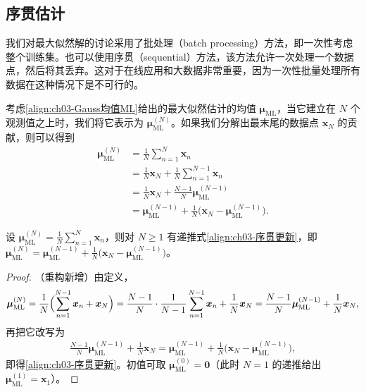 \documentclass[../../main.tex]{subfiles}
\begin{document}
\subsection{序贯估计}\label{subsection:ch03-序贯估计}

我们对最大似然解的讨论采用了批处理（batch processing）方法，即一次性考虑整个训练集。也可以使用序贯（sequential）方法，该方法允许一次处理一个数据点，然后将其丢弃。这对于在线应用和大数据非常重要，因为一次性批量处理所有数据在这种情况下是不可行的。

考虑\eqref{align:ch03-Gauss均值ML}给出的最大似然估计的均值 $\boldsymbol{\mu}_{\mathrm{ML}}$，当它建立在 $N$ 个观测值之上时，我们将它表示为 $\boldsymbol{\mu}_{\mathrm{ML}}^{(N)}$。如果我们分解出最末尾的数据点 $\boldsymbol{x}_N$ 的贡献，则可以得到
\begin{align}
\boldsymbol{\mu}_{\mathrm{ML}}^{(N)}&=\frac{1}{N}\sum_{n=1}^{N}\boldsymbol{x}_n\nonumber\\
&=\frac{1}{N}\boldsymbol{x}_N+\frac{1}{N}\sum_{n=1}^{N-1}\boldsymbol{x}_n\nonumber\\
&=\frac{1}{N}\boldsymbol{x}_N+\frac{N-1}{N}\boldsymbol{\mu}_{\mathrm{ML}}^{(N-1)}\nonumber\\
&=\boldsymbol{\mu}_{\mathrm{ML}}^{(N-1)}+\frac{1}{N}\bigl(\boldsymbol{x}_N-\boldsymbol{\mu}_{\mathrm{ML}}^{(N-1)}\bigr).
\label{align:ch03-序贯更新}
\end{align}

\begin{proposition}[样本均值的序贯更新]\label{proposition:ch03-序贯更新}
设 $\boldsymbol{\mu}_{\mathrm{ML}}^{(N)}=\frac{1}{N}\sum_{n=1}^{N}\boldsymbol{x}_n$，则对 $N\geqslant1$ 有递推式\eqref{align:ch03-序贯更新}，即 $\boldsymbol{\mu}_{\mathrm{ML}}^{(N)}=\boldsymbol{\mu}_{\mathrm{ML}}^{(N-1)}+\frac{1}{N}\bigl(\boldsymbol{x}_N-\boldsymbol{\mu}_{\mathrm{ML}}^{(N-1)}\bigr)$。
\end{proposition}
\begin{proof}
（重构新增）由定义，
\begin{align*}
\boldsymbol{\mu}_{\mathrm{ML}}^{(N)}=\frac{1}{N}\Bigl(\sum_{n=1}^{N-1}\boldsymbol{x}_n+\boldsymbol{x}_N\Bigr)=\frac{N-1}{N}\cdot\frac{1}{N-1}\sum_{n=1}^{N-1}\boldsymbol{x}_n+\frac{1}{N}\boldsymbol{x}_N=\frac{N-1}{N}\boldsymbol{\mu}_{\mathrm{ML}}^{(N-1)}+\frac{1}{N}\boldsymbol{x}_N,
\end{align*}
再把它改写为
\begin{align*}
\frac{N-1}{N}\boldsymbol{\mu}_{\mathrm{ML}}^{(N-1)}+\frac{1}{N}\boldsymbol{x}_N=\boldsymbol{\mu}_{\mathrm{ML}}^{(N-1)}+\frac{1}{N}\bigl(\boldsymbol{x}_N-\boldsymbol{\mu}_{\mathrm{ML}}^{(N-1)}\bigr),
\end{align*}
即得\eqref{align:ch03-序贯更新}。初值可取 $\boldsymbol{\mu}_{\mathrm{ML}}^{(0)}=\boldsymbol{0}$（此时 $N=1$ 的递推给出 $\boldsymbol{\mu}_{\mathrm{ML}}^{(1)}=\boldsymbol{x}_1$）。
\end{proof}
\end{document}
